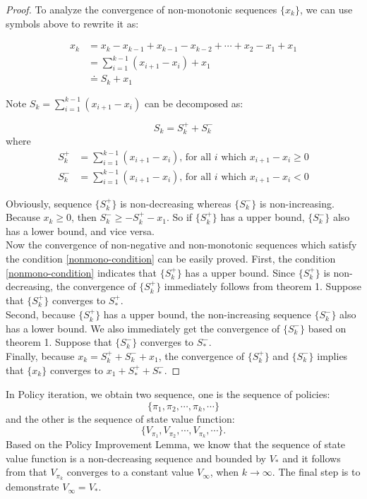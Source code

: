 \begin{proof}
    To analyze the convergence of non-monotonic sequences $\{x_{k}\}$, we can use symbols above to rewrite it as:

    \begin{align*}
        x_{k} &= x_{k} - x_{k-1} + x_{k-1} - x_{k-2}+\cdots + x_{2}-x_{1}+x_{1} \\
            &= \sum_{i=1}^{k-1}(x_{i+1}-x_{i})+x_{1} \\ 
            &\doteq S_{k} + x_{1}
    \end{align*}

    Note $S_{k}=\sum_{i=1}^{k-1}(x_{i+1}-x_{i})$ can be decomposed as:

    \begin{equation*}
        S_{k}=S_{k}^+ + S_{k}^-
    \end{equation*}
    where 
    \begin{align*}
        S_{k}^+ &= \sum_{i=1}^{k-1}(x_{i+1}-x_{i})\text{, for all } i \text{ which }x_{i+1}-x_{i} \ge 0 \\
        S_{k}^- &=\sum_{i=1}^{k-1}(x_{i+1}-x_{i})\text{, for all } i \text{ which }x_{i+1}-x_{i}<0
    \end{align*}

    Obviously, sequence $\{S_{k}^+\}$ is non-decreasing whereas $\{S_{k}^-\}$ is non-increasing. \\[6pt]
    Because $x_{k}\ge 0$, then $S_{k}^-\ge - S_{k}^+ - x_{1}$. So if $\{S_{k}^+\}$ has a upper bound, $\{S_{k}^-\}$ also has a lower bound, and vice versa. \\[6pt]
    Now the convergence of non-negative and non-monotonic sequences which satisfy the condition \ref{nonmono-condition} can be easily proved.
    First, the condition \ref{nonmono-condition} indicates that $\{S_{k}^+\}$ has a upper bound. Since $\{S_{k}^+\}$ is non-decreasing, the convergence of $\{S_{k}^+\}$ immediately follows from theorem 1. Suppose that $\{S_{k}^+\}$ converges to $S_{*}^+$. \\[6pt]
    Second, because $\{S_{k}^+\}$ has a upper bound, the non-increasing sequence $\{S_{k}^-\}$ also has a lower bound.  We also immediately get the convergence of $\{S_{k}^-\}$ based on theorem 1. Suppose that $\{S_{k}^-\}$ converges to $S_{*}^-$. \\[6pt]
    Finally, because $x_{k}=S_{k}^+ + S_{k}^- +x_{1}$, the convergence of $\{S_{k}^+\}$ and $\{S_{k}^-\}$ implies that $\{x_k\}$ converges to $x_{1}+S_{*}^++S_{*}^-$.
\end{proof}
In Policy iteration, we obtain two sequence, one is the sequence of policies:
\[
    \{\pi_{1},\pi_{2}, \cdots, \pi_{k}, \cdots\}
\]and the other is the sequence of state value function: 
\[
    \{V_{\pi_{1}},V_{\pi_{2}},\cdots,V_{\pi_{k}},\cdots\}.
\]Based on the Policy Improvement Lemma, we know that the sequence of state value function is a non-decreasing sequence and bounded by $V_{*}$ and it follows from  that $V_{\pi_{k}}$ converges to a constant value $V_{\infty}$, when $k \to \infty$. The final step is to demonstrate $V_{\infty}=V_{*}$.

